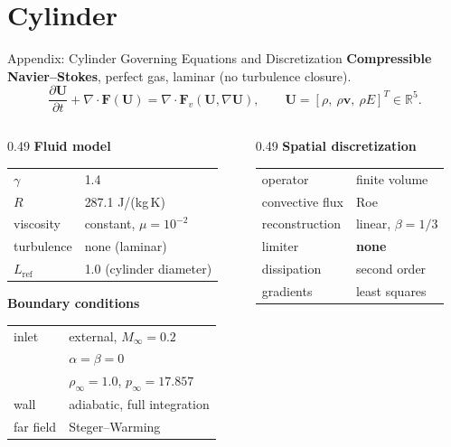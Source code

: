\documentclass[aspectratio=169]{beamer}
\begin{document}
\BurgersSolutionFigureFrames

\section{Cylinder}

\begin{frame}{Appendix: Cylinder Governing Equations and Discretization}
\scriptsize
\textbf{Compressible Navier--Stokes}, perfect gas, laminar (no turbulence closure).
\[
\frac{\partial \mathbf{U}}{\partial t}+\nabla\!\cdot\!\mathbf{F}(\mathbf{U})
=\nabla\!\cdot\!\mathbf{F}_v(\mathbf{U},\nabla\mathbf{U}),
\qquad
\mathbf{U}=[\rho,\ \rho\mathbf{v},\ \rho E]^T \in \mathbb{R}^5 .
\]

\vspace{0.2em}
\begin{columns}[T,onlytextwidth]
\begin{column}{0.49\textwidth}
\textbf{Fluid model}
\begin{tabular}{ll}
$\gamma$              & 1.4 \\
$R$                   & 287.1 J/(kg\,K) \\
viscosity             & constant, $\mu=10^{-2}$ \\
turbulence            & none (laminar) \\
$L_{\mathrm{ref}}$    & 1.0 (cylinder diameter)
\end{tabular}

\vspace{0.5em}
\textbf{Boundary conditions}
\begin{tabular}{ll}
inlet      & external, $M_\infty=0.2$ \\
           & $\alpha=\beta=0$ \\
           & $\rho_\infty=1.0$, $p_\infty=17.857$ \\
wall       & adiabatic, full integration \\
far field  & Steger--Warming
\end{tabular}
\end{column}
\begin{column}{0.49\textwidth}
\textbf{Spatial discretization}
\begin{tabular}{ll}
operator        & finite volume \\
convective flux & Roe \\
reconstruction  & linear, $\beta=1/3$ \\
limiter         & \textbf{none} \\
dissipation     & second order \\
gradients       & least squares
\end{tabular}


\end{column}
\end{columns}
\end{frame}
\end{document}
